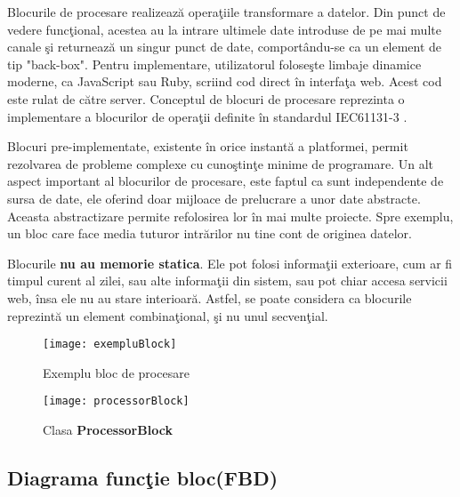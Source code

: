Blocurile de procesare realizează operaţiile transformare a datelor. Din punct de vedere funcţional, acestea au la intrare ultimele date introduse de pe mai multe canale şi returnează un singur punct de date, comportându-se ca un element de tip "back-box"\autocite{functionBlocks}. Pentru implementare, utilizatorul foloseşte limbaje dinamice moderne, ca JavaScript sau Ruby, scriind cod direct în interfaţa web. Acest cod este rulat de către server. 
Conceptul de blocuri de procesare reprezinta o implementare a blocurilor de operaţii definite în standardul  IEC61131-3 \autocite[Apendix C]{IEC61131-3} .

Blocuri pre-implementate, existente în orice instantă a platformei, permit rezolvarea de probleme complexe cu cunoştinţe minime de programare.
Un alt aspect important al blocurilor de procesare, este faptul ca sunt independente de sursa de date, ele oferind doar mijloace de prelucrare a unor date abstracte. Aceasta abstractizare permite refolosirea lor în mai multe proiecte. Spre exemplu, un bloc care face media tuturor intrărilor nu tine cont de originea datelor. 

Blocurile \textbf{nu au memorie statica}. Ele pot folosi informaţii exterioare, cum ar fi timpul curent al zilei, sau alte informaţii din sistem, sau pot chiar accesa servicii web, însa ele nu au stare interioară. Astfel, se poate considera ca blocurile reprezintă un element combinaţional, şi nu unul secvenţial.
\begin{figure}[H]
	\centering
	\texttt{[image: exempluBlock]}
	\caption{Exemplu bloc de procesare}
\end{figure}

\begin{figure}[H]
	\centering
	\texttt{[image: processorBlock]}
	\caption{Clasa \textbf{ProcessorBlock}}
\end{figure}

\subsection{Diagrama funcţie bloc(FBD)}

